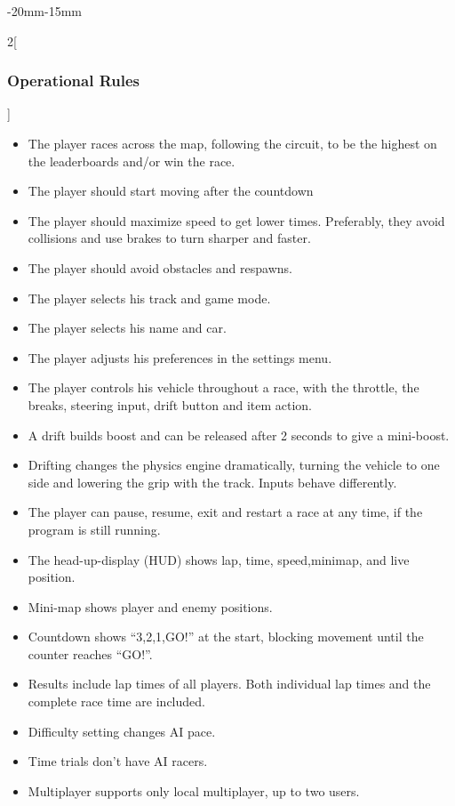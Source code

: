 \documentclass[12pt]{article}
\begin{document}
\begin{adjustwidth}{-20mm}{-15mm}
\begin{multicols}{2}[\subsubsection{Operational Rules}]
\raggedcolumns
\begin{itemize}
\item The player races across the map, following the circuit, to be the highest on the leaderboards and/or win the race.
\item The player should start moving after the countdown
\item The player should maximize speed to get lower times. Preferably, they avoid collisions and use brakes to turn sharper and faster.
\item The player should avoid obstacles and respawns.
\item The player selects his track and game mode.
\item The player selects his name and car.
\item The player adjusts his preferences in the settings menu.
\item The player controls his vehicle throughout a race, with the throttle, the breaks, steering input, drift button and item action.
\item A drift builds boost and can be released after 2 seconds to give a mini-boost.
\item Drifting changes the physics engine dramatically, turning the vehicle to one side and lowering the grip with the track. Inputs behave differently.
\item The player can pause, resume, exit and restart a race at any time, if the program is still running.
\item The head-up-display (HUD) shows lap, time, speed,minimap, and live position.
\item Mini-map shows player and enemy positions.
\item Countdown shows ``3,2,1,GO!'' at the start, blocking movement until the counter reaches ``GO!''.
\item Results include lap times of all players. Both individual lap times and the complete race time are included.
\item Difficulty setting changes AI pace.
\item Time trials don’t have AI racers.
\item Multiplayer supports only local multiplayer, up to two users.
\end{itemize}
\end{multicols}
\end{adjustwidth}
\end{document}
